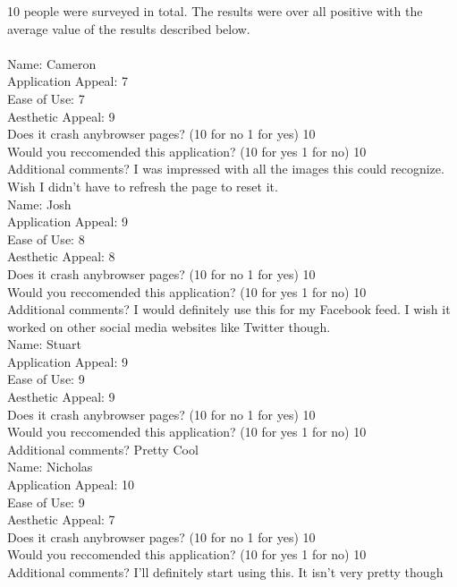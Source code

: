 \documentclass[12pt, titlepage]{article}
\begin{document}
10 people were surveyed in total. The results were over all positive with the average value of the results described below.	\\
\\
Name: Cameron\\
Application Appeal: 7 \\ 
Ease of Use: 7\\ 
Aesthetic Appeal: 9\\ 
Does it crash anybrowser pages? (10 for no 1 for yes) 10\\ 
Would you reccomended this application? (10 for yes 1 for no) 10\\ 
Additional comments? I was impressed with all the images this could recognize. Wish I didn't have to refresh the page to reset it.\\

Name: Josh\\
Application Appeal: 9 \\ 
Ease of Use: 8\\ 
Aesthetic Appeal: 8\\ 
Does it crash anybrowser pages? (10 for no 1 for yes) 10\\ 
Would you reccomended this application? (10 for yes 1 for no) 10\\ 
Additional comments? I would definitely use this for my Facebook feed. I wish it worked on other social media websites like Twitter though.\\

Name: Stuart\\
Application Appeal: 9 \\ 
Ease of Use: 9\\ 
Aesthetic Appeal: 9\\ 
Does it crash anybrowser pages? (10 for no 1 for yes) 10\\ 
Would you reccomended this application? (10 for yes 1 for no) 10\\ 
Additional comments? Pretty Cool\\

Name: Nicholas\\
Application Appeal: 10 \\ 
Ease of Use: 9\\ 
Aesthetic Appeal: 7\\ 
Does it crash anybrowser pages? (10 for no 1 for yes) 10\\ 
Would you reccomended this application? (10 for yes 1 for no) 10\\ 
Additional comments? I'll definitely start using this. It isn't very pretty though\\
\end{document}
